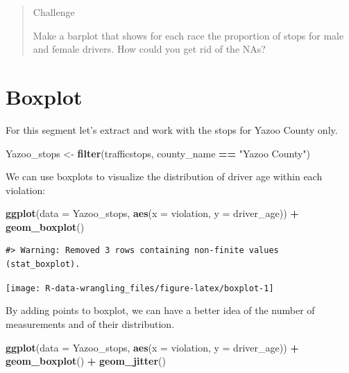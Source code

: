 \documentclass[]{book}
\newenvironment{Shaded}{\begin{snugshade}}{\end{snugshade}}
\newcommand{\DataTypeTok}[1]{\textcolor[rgb]{0.13,0.29,0.53}{#1}}
\newcommand{\KeywordTok}[1]{\textcolor[rgb]{0.13,0.29,0.53}{\textbf{#1}}}
\newcommand{\NormalTok}[1]{#1}
\newcommand{\OperatorTok}[1]{\textcolor[rgb]{0.81,0.36,0.00}{\textbf{#1}}}
\newcommand{\StringTok}[1]{\textcolor[rgb]{0.31,0.60,0.02}{#1}}
\begin{document}
\begin{quote}
Challenge

Make a barplot that shows for each race the proportion of stops for male and female drivers. How could you get rid of the NAs?
\end{quote}

\hypertarget{boxplot}{%
\section{Boxplot}\label{boxplot}}

For this segment let's extract and work with the stops for Yazoo County only.

\begin{Shaded}
\begin{Highlighting}[]
\NormalTok{Yazoo_stops <-}\StringTok{ }\KeywordTok{filter}\NormalTok{(trafficstops, county_name }\OperatorTok{==}\StringTok{ "Yazoo County"}\NormalTok{)}
\end{Highlighting}
\end{Shaded}

We can use boxplots to visualize the distribution of driver age within each violation:

\begin{Shaded}
\begin{Highlighting}[]
\KeywordTok{ggplot}\NormalTok{(}\DataTypeTok{data =}\NormalTok{ Yazoo_stops, }\KeywordTok{aes}\NormalTok{(}\DataTypeTok{x =}\NormalTok{ violation, }\DataTypeTok{y =}\NormalTok{ driver_age)) }\OperatorTok{+}
\StringTok{    }\KeywordTok{geom_boxplot}\NormalTok{()}
\end{Highlighting}
\end{Shaded}

\begin{verbatim}
#> Warning: Removed 3 rows containing non-finite values (stat_boxplot).
\end{verbatim}

\texttt{[image: R-data-wrangling\_files/figure-latex/boxplot-1]}

By adding points to boxplot, we can have a better idea of the number of
measurements and of their distribution.

\begin{Shaded}
\begin{Highlighting}[]
\KeywordTok{ggplot}\NormalTok{(}\DataTypeTok{data =}\NormalTok{ Yazoo_stops, }\KeywordTok{aes}\NormalTok{(}\DataTypeTok{x =}\NormalTok{ violation, }\DataTypeTok{y =}\NormalTok{ driver_age)) }\OperatorTok{+}
\StringTok{    }\KeywordTok{geom_boxplot}\NormalTok{() }\OperatorTok{+}
\StringTok{    }\KeywordTok{geom_jitter}\NormalTok{()}
\end{Highlighting}
\end{Shaded}
\end{document}
